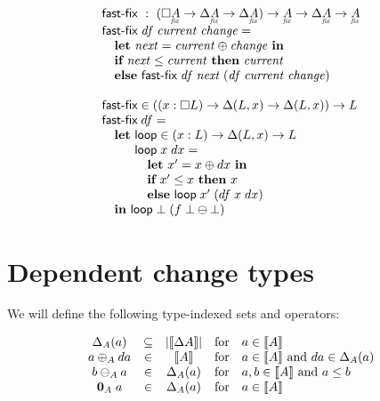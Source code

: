 \documentclass{article}
\theoremstyle{plain}
\theoremstyle{definition}
\begin{document}
\[\begin{array}{l}
  \textsf{fast-fix} ~:~
  (\Disc{\fixtype{A}} \to \Ch\fixtype{A} \to \Ch\fixtype{A})
  \to \fixtype{A} \to \Ch\fixtype{A} \to \fixtype{A}\\
  \textsf{fast-fix}\; \mi{df}\; \mi{current}\; \mi{change} =\\
  \quad \textbf{let}~ {\mi{next} = \mi{current} \oplus \mi{change}}
  ~\textbf{in}\\
  \quad \textbf{if}~ \mi{next} \le \mi{current}
  ~\textbf{then}~ \mi{current}\\
  \quad \textbf{else}~ \textsf{fast-fix}\; \mi{df}\; \mi{next}
  \;(\mi{df}\; \mi{current}\; \mi{change})\\
  \\
  \textsf{fast-fix}
  \in ((x : \Disc{L}) \to \Delta(L, x) \to \Delta(L, x)) \to L
  \\
  \textsf{fast-fix} \; df =\\
  \quad\textbf{let}~ \textsf{loop} \in (x : L) \to \Delta(L, x) \to L\\
  \quad\phantom{\textbf{let}~} \textsf{loop} \;x \;dx =\\
  \quad\phantom{\textbf{let}~}\quad
  \textbf{let}~ x' = x \oplus dx ~\textbf{in}\\
  \quad\phantom{\textbf{let}~}\quad
  \textbf{if}~ x' \le x ~\textbf{then}~ x\\
  \quad\phantom{\textbf{let}~}\quad
  \textbf{else}~\textsf{loop} \;x' \;(df \; x \; dx)\\
  \quad\textbf{in}~ \textsf{loop} \; \unit \; (f \; \unit \ominus \unit)
\end{array}\]


\section{Dependent change types}

We will define the following type-indexed sets and operators:

\[\begin{array}{ccccl}
  \Delta_{A}({a}) &\subseteq& |{\llbracket{\Delta{A}}\rrbracket}|
  &\text{for}& a \in {\llbracket{A}\rrbracket}
  \\
  a \oplus_A da &\in& {\llbracket{A}\rrbracket}
  &\text{for}& a \in {\llbracket{A}\rrbracket} ~\text{and}~ da \in \Delta_{A}({a})
  \\
  b \ominus_A a &\in& \Delta_{A}({a})
  &\text{for}& a, b \in {\llbracket{A}\rrbracket} ~\text{and}~ a \le b
  \\
  \mathbf{0}_A\; a &\in& \Delta_{A}({a})
  &\text{for}& a \in {\llbracket{A}\rrbracket}
\end{array}\]
\end{document}
